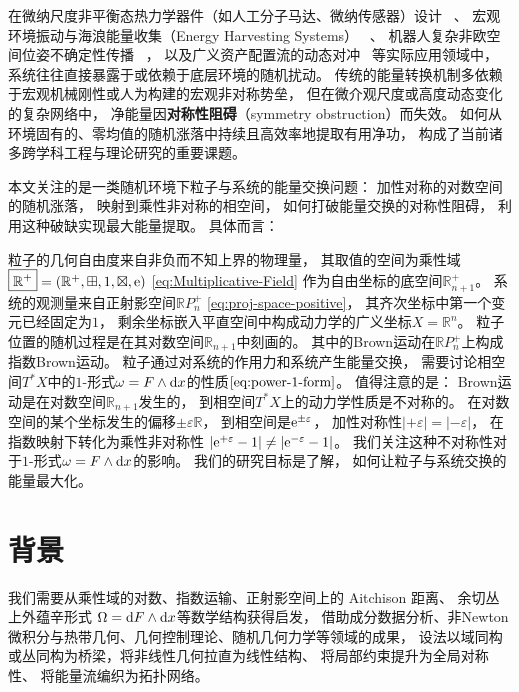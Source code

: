﻿\documentclass[10pt,a4paper]{article}
\numberwithin{equation}{section}
\begin{document}
在微纳尺度非平衡态热力学器件（如人工分子马达、微纳传感器）设计~
\cite{Filippetti2021Brownian, Sasa2014Stochastic, Wijns2024Microscopic}、
宏观环境振动与海浪能量收集（Energy Harvesting Systems）~
\cite{Xu2023Brownian, Thibado2023Charging}、
机器人复杂非欧空间位姿不确定性传播~
\cite{Wang2019Lie}，
以及广义资产配置流的动态对冲~
\cite{Fernholz2002Stochastic, Karatzas2007Stochastic, Imkeller2010Geometry, Amari2020Information, Gu2020Empirical}
等实际应用领域中，
系统往往直接暴露于或依赖于底层环境的随机扰动。
传统的能量转换机制多依赖于宏观机械刚性或人为构建的宏观非对称势垒，
但在微介观尺度或高度动态变化的复杂网络中，
净能量因\textbf{对称性阻碍}（symmetry obstruction）而失效。
如何从环境固有的、零均值的随机涨落中持续且高效率地提取有用净功，
构成了当前诸多跨学科工程与理论研究的重要课题。

本文关注的是一类随机环境下粒子与系统的能量交换问题：
加性对称的对数空间的随机涨落，
映射到乘性非对称的相空间，
如何打破能量交换的对称性阻碍，
利用这种破缺实现最大能量提取。
具体而言：

粒子的几何自由度来自非负而不知上界的物理量，
其取值的空间为乘性域
$\boxed{\mathbb R^+} = (\mathbb R^+,\mathbin{\boxplus},1,\mathbin{\boxtimes},\text e)$
\eqref{eq:Multiplicative-Field}
作为自由坐标的底空间$\boxed{\mathbb R^+_{n+1}}$。
系统的观测量来自正射影空间$\mathbb R P^+_n$
\eqref{eq:proj-space-positive}，
其齐次坐标中第一个变元已经固定为$1$，
剩余坐标嵌入平直空间中构成动力学的广义坐标$X = \mathbb R^n$。
粒子位置的随机过程是在其对数空间$\mathbb R_{n+1}$中刻画的。
其中的Brown运动在$\mathbb R P^+_n$上构成指数Brown运动。
粒子通过对系统的作用力和系统产生能量交换，
需要讨论相空间$T^*X$中的$1$-形式$\omega = F \wedge \text dx$的性质$\eqref{eq:power-1-form}$。
值得注意的是：
Brown运动是在对数空间$\mathbb R_{n+1}$发生的，
到相空间$T^*X$上的动力学性质是不对称的。
在对数空间的某个坐标发生的偏移$\pm\varepsilon \mathbb R$，
到相空间是$\text e^{\pm\varepsilon}$，
加性对称性$|+\varepsilon| = |-\varepsilon|$，
在指数映射下转化为乘性非对称性
$|\text e^{+\varepsilon} - 1| \neq |\text e^{-\varepsilon} - 1|$。
我们关注这种不对称性对于$1$-形式$\omega = F \wedge \text dx$的影响。
我们的研究目标是了解，
如何让粒子与系统交换的能量最大化。

\section{背景}

我们需要从乘性域的对数、指数运输、正射影空间上的 Aitchison 距离、
余切丛上外蕴辛形式 $\Omega = \text dF \wedge \text dx$等数学结构获得启发，
借助成分数据分析、非Newton微积分与热带几何、几何控制理论、随机几何力学等领域的成果，
设法以域同构或丛同构为桥梁，将非线性几何拉直为线性结构、
将局部约束提升为全局对称性、
将能量流编织为拓扑网络。
\end{document}
